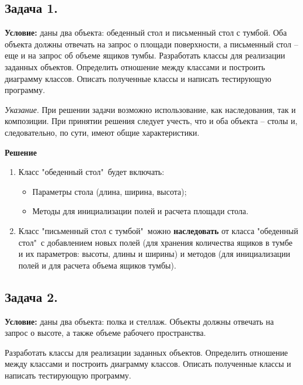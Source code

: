 \subsection{Задача 1.}
{\bf Условие:} даны два объекта: обеденный стол и письменный стол с тумбой. Оба объекта должны отвечать на запрос о площади поверхности, а письменный стол – еще и на запрос об объеме ящиков тумбы. Разработать классы для реализации заданных объектов. Определить отношение между классами и построить диаграмму классов. Описать полученные классы и написать тестирующую программу. 

{\textit {Указание}}. При решении задачи возможно использование, как наследования, так и композиции. При принятии решения следует учесть, что и оба объекта – столы и, следовательно, по сути, имеют общие характеристики.


{\bf Решение}

\begin{enumerate}
\item Класс "обеденный стол"\ будет включать:
\begin{itemize}
    \item Параметры стола (длина, ширина, высота);
    \item Методы для инициализации полей и расчета площади стола.
\end{itemize}

\item Класс "письменный стол с тумбой"\ можно {\bf наследовать} от класса "обеденный стол"\, с добавлением новых полей (для хранения количества ящиков в тумбе и их параметров: высоты, длины и ширины) и методов (для инициализации полей и для расчета объема ящиков тумбы). 
\end{enumerate}

{}


{}



\newpage\subsection{Задача 2.}
{\bf Условие:} даны два объекта: полка и стеллаж. Объекты должны отвечать на запрос о высоте, а также 
объеме рабочего пространства.

Разработать классы для реализации заданных объектов. Определить отношение между классами и 
построить диаграмму классов. Описать полученные классы и написать тестирующую программу. 


